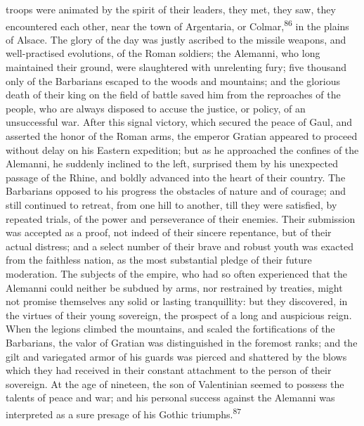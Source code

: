 troops were animated by the spirit of their leaders, they met,
they saw, they encountered each other, near the town of
Argentaria, or Colmar,\textsuperscript{86} in the plains of Alsace. The glory of
the day was justly ascribed to the missile weapons, and
well-practised evolutions, of the Roman soldiers; the Alemanni,
who long maintained their ground, were slaughtered with
unrelenting fury; five thousand only of the Barbarians escaped to
the woods and mountains; and the glorious death of their king on
the field of battle saved him from the reproaches of the people,
who are always disposed to accuse the justice, or policy, of an
unsuccessful war. After this signal victory, which secured the
peace of Gaul, and asserted the honor of the Roman arms, the
emperor Gratian appeared to proceed without delay on his Eastern
expedition; but as he approached the confines of the Alemanni, he
suddenly inclined to the left, surprised them by his unexpected
passage of the Rhine, and boldly advanced into the heart of their
country. The Barbarians opposed to his progress the obstacles of
nature and of courage; and still continued to retreat, from one
hill to another, till they were satisfied, by repeated trials, of
the power and perseverance of their enemies. Their submission was
accepted as a proof, not indeed of their sincere repentance, but
of their actual distress; and a select number of their brave and
robust youth was exacted from the faithless nation, as the most
substantial pledge of their future moderation. The subjects of
the empire, who had so often experienced that the Alemanni could
neither be subdued by arms, nor restrained by treaties, might not
promise themselves any solid or lasting tranquillity: but they
discovered, in the virtues of their young sovereign, the prospect
of a long and auspicious reign. When the legions climbed the
mountains, and scaled the fortifications of the Barbarians, the
valor of Gratian was distinguished in the foremost ranks; and the
gilt and variegated armor of his guards was pierced and shattered
by the blows which they had received in their constant attachment
to the person of their sovereign. At the age of nineteen, the son
of Valentinian seemed to possess the talents of peace and war;
and his personal success against the Alemanni was interpreted as
a sure presage of his Gothic triumphs.\textsuperscript{87}


